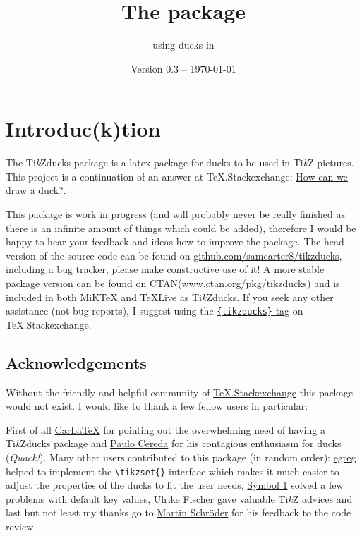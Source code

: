 \documentclass[parskip=half]{scrartcl}
\title{The \texorpdfstring{\tikzducks}{tikzducks} package}
\subtitle{using ducks in \TikZ}
\author{%
	\texorpdfstring{\texttt{samcarter} (alias 
		\begin{tikzpicture}[scale=0.3,baseline=5pt]
			\duck[body=yellow!50!brown!50!white,
					longhair=red!50!brown, 
					jacket=blue!50!black]
		\end{tikzpicture})\\[0.8em]
		\url{https://github.com/samcarter8/tikzducks}\\
		\url{https://www.ctan.org/pkg/tikzducks}
	}{samcarter}}
\date{Version 0.3 -- \today}
\newcommand{\CTAN}{\textsc{CTAN}\xspace}
\newcommand{\TikZ}{Ti\emph{k}Z\xspace}
\newcommand{\tikzducks}{Ti\emph{k}Zducks\xspace}
\newcommand{\miktex}{MiK\TeX\xspace}
\newcommand{\texlive}{\TeX{}Live\xspace}
\begin{document}
\maketitle
\thispagestyle{scrheadings}

\section{Introduc(k)tion}
\label{intro}

The \tikzducks package is a latex package for ducks to be used in \TikZ pictures. 
This project is a continuation of an answer at TeX.Stackexchange: \href{tex.stackexchange.com/a/347458/36296}{How can we draw a duck?}.

This package is work in progress (and will probably never be really finished as there is an infinite amount of things which could be added), therefore I would be happy to hear your feedback and ideas how to improve the package. 
The head version of the source code can be found on \url{github.com/samcarter8/tikzducks}, including a bug tracker, please make constructive use of it! A more stable package version can be found on \CTAN (\url{www.ctan.org/pkg/tikzducks}) and is included in both \miktex and \texlive as \tikzducks. If you seek any other assistance (not bug reports), I suggest using the \href{https://tex.stackexchange.com/questions/tagged/tikzducks}{\texttt{\{tikzducks\}}-tag} on TeX.Stackexchange.

\subsection{Acknowledgements}

Without the friendly and helpful community of \href{https://tex.stackexchange.com/}{TeX.Stackexchange} this package would not exist. I would like to thank a few fellow users in particular:

First of all \href{https://tex.stackexchange.com/users/101651/carlatex}{CarLaTeX} for pointing out the overwhelming need of having a \tikzducks package and \href{https://tex.stackexchange.com/users/3094/paulo-cereda}{Paulo Cereda} for his contagious enthusiasm for ducks (\emph{Quack!}). Many other users contributed to this package (in random order): \href{https://tex.stackexchange.com/users/4427/egreg}{egreg} helped to implement the \lstinline|\tikzset{}| interface which makes it much easier to adjust the properties of the ducks to fit the user needs, \href{https://tex.stackexchange.com/users/51022/symbol-1}{Symbol 1}  solved a few problems with default key values, \href{https://tex.stackexchange.com/users/2388/ulrike-fischer}{Ulrike Fischer} gave valuable \TikZ advices and last but not least my thanks go to \href{https://tex.stackexchange.com/users/5763/martin-schr%c3%b6der}{Martin Schr\"oder} for his feedback to the code review.
\end{document}
